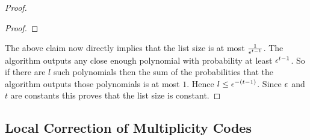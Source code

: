 \begin{proof}
\begin{claimwidth}
\begin{proof}
\end{proof}
\end{claimwidth}
The above claim now directly implies that the list size is at most $\frac1{\epsilon^{t-1}}$. The algorithm outputs any close enough polynomial with probability at least $\epsilon^{t-1}$. So if there are $l$ such polynomials then the sum of the probabilities that the algorithm outputs those polynomials is at most $1$. Hence $l\leq \epsilon^{-(t-1)}$. Since $\epsilon$ and $t$ are constants this proves that the list size is constant. 
\end{proof}
\subsection{Local Correction of Multiplicity Codes}